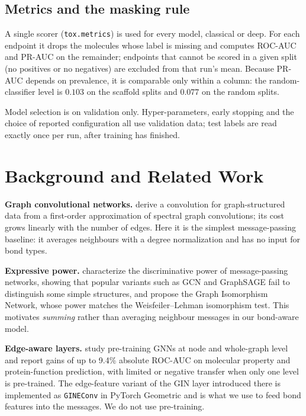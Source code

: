 \documentclass[conference]{IEEEtran}
\newcommand{\code}[1]{\texttt{\small #1}}
\begin{document}
\subsection{Metrics and the masking rule}
A single scorer (\code{tox.metrics}) is used for every model, classical or deep. For each
endpoint it drops the molecules whose label is missing and computes ROC-AUC and PR-AUC on the
remainder; endpoints that cannot be scored in a given split (no positives or no negatives) are
excluded from that run's mean. Because PR-AUC depends on prevalence, it is comparable only
within a column: the random-classifier level is $0.103$ on the scaffold splits and $0.077$ on
the random splits.

Model selection is on validation only. Hyper-parameters, early stopping and the choice of
reported configuration all use validation data; test labels are read exactly once per run, after
training has finished.

\section{Background and Related Work}
\textbf{Graph convolutional networks.} \citet{kipf2017gcn} derive a convolution for
graph-structured data from a first-order approximation of spectral graph convolutions; its cost
grows linearly with the number of edges. Here it is the simplest message-passing baseline: it
averages neighbours with a degree normalization and has no input for bond types.

\textbf{Expressive power.} \citet{xu2019gin} characterize the discriminative power of
message-passing networks, showing that popular variants such as GCN and GraphSAGE fail to
distinguish some simple structures, and propose the Graph Isomorphism Network, whose power
matches the Weisfeiler--Lehman isomorphism test. This motivates \emph{summing} rather than
averaging neighbour messages in our bond-aware model.

\textbf{Edge-aware layers.} \citet{hu2020pretrain} study pre-training GNNs at node and
whole-graph level and report gains of up to 9.4\% absolute ROC-AUC on molecular property and
protein-function prediction, with limited or negative transfer when only one level is
pre-trained. The edge-feature variant of the GIN layer introduced there is implemented as
\code{GINEConv} in PyTorch Geometric \citep{fey2019pyg} and is what we use to feed bond features
into the messages. We do not use pre-training.
\end{document}
